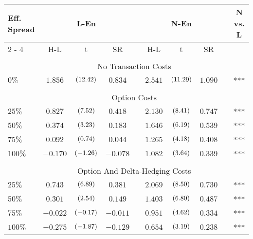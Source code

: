 \begin{tabular}{@{}lccccccccc@{}}%
\toprule%
Eff. Spread&\multicolumn{3}{c}{L{-}En}&&\multicolumn{3}{c}{N{-}En}&&N vs. L\\%
\cmidrule{2%
-%
4}%
\cmidrule{6%
-%
8}%
\multicolumn{1}{c}{}&\multicolumn{1}{c}{H{-}L}&\multicolumn{1}{c}{t}&\multicolumn{1}{c}{SR}&\multicolumn{1}{c}{}&\multicolumn{1}{c}{H{-}L}&\multicolumn{1}{c}{t}&\multicolumn{1}{c}{SR}&\multicolumn{1}{c}{}&\multicolumn{1}{c}{}\\%
\midrule%
&&&&&&&&&\\%
&\multicolumn{8}{c}{No Transaction Costs}&\\%
\midrule%
$0\%$&$1.856$&$\footnotesize{(12.42)}$&$0.834$&&$2.541$&$\footnotesize{(11.29)}$&$1.090$&&***\\%
&&&&&&&&&\\%
&\multicolumn{8}{c}{Option Costs}&\\%
\midrule%
$25\%$&$0.827$&$\footnotesize{(7.52)}$&$0.418$&&$2.130$&$\footnotesize{(8.41)}$&$0.747$&&***\\%
$50\%$&$0.374$&$\footnotesize{(3.23)}$&$0.183$&&$1.646$&$\footnotesize{(6.19)}$&$0.539$&&***\\%
$75\%$&$0.092$&$\footnotesize{(0.74)}$&$0.044$&&$1.265$&$\footnotesize{(4.18)}$&$0.408$&&***\\%
$100\%$&$-0.170$&$\footnotesize{(-1.26)}$&$-0.078$&&$1.082$&$\footnotesize{(3.64)}$&$0.339$&&***\\%
&&&&&&&&&\\%
&\multicolumn{8}{c}{Option And Delta{-}Hedging Costs}&\\%
\midrule%
$25\%$&$0.743$&$\footnotesize{(6.89)}$&$0.381$&&$2.069$&$\footnotesize{(8.50)}$&$0.730$&&***\\%
$50\%$&$0.301$&$\footnotesize{(2.54)}$&$0.149$&&$1.403$&$\footnotesize{(6.80)}$&$0.487$&&***\\%
$75\%$&$-0.022$&$\footnotesize{(-0.17)}$&$-0.011$&&$0.951$&$\footnotesize{(4.62)}$&$0.334$&&***\\%
$100\%$&$-0.275$&$\footnotesize{(-1.87)}$&$-0.129$&&$0.654$&$\footnotesize{(3.19)}$&$0.238$&&***\\\bottomrule%
%
\end{tabular}